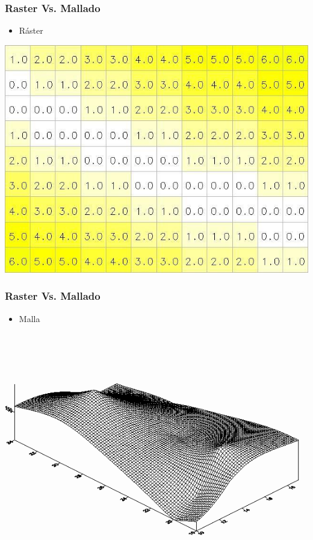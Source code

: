 \begin{frame}
  \frametitle{Raster Vs. Mallado}
  \begin{itemize}
    \item Ráster 
  \end{itemize}
  \begin{center}
        \includegraphics[height=0.60\textheight]{images/raster}
  \end{center}
\end{frame}
\begin{frame}
  \frametitle{Raster Vs. Mallado}
  \begin{itemize}
    \item Malla 
  \end{itemize}
  \begin{center}
        \includegraphics[height=0.60\textheight]{images/mallado}
  \end{center}
\end{frame}
